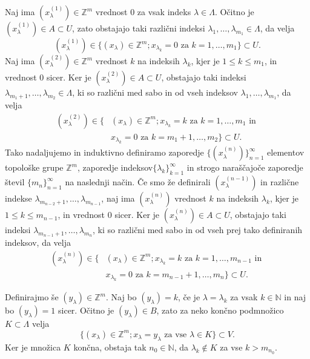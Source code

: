 \documentclass[mat1]{fmfdelo}
\newcommand{\N}{\mathbb N}
\newcommand{\Z}{\mathbb Z}
\begin{document}
\begin{dokaz}
Naj ima $(x_\lambda^{(1)}) \in \Z^m$ vrednost $0$ za vsak indeks $\lambda \in \Lambda$. Očitno je $(x_\lambda^{(1)}) \in A \subset U$, zato obstajajo taki različni indeksi $\lambda_1,\dots, \lambda_{m_1} \in \Lambda$, da velja
\[ (x_\lambda^{(1)}) \in \lbrace (x_\lambda) \in \Z^m ; x_{\lambda_k} = 0 \text{ za } k=1,\dots,m_1\rbrace \subset U. \]
Naj ima $(x_\lambda^{(2)}) \in \Z^m$ vrednost $k$ na indeksih $\lambda_k$, kjer je $1 \leq k \leq m_1$, in vrednost $0$ sicer. Ker je $(x_\lambda^{(2)}) \in A \subset U$, obstajajo taki indeksi $\lambda_{m_1+1},\dots,\lambda_{m_2} \in \Lambda$, ki so različni med sabo in od vseh indeksov $\lambda_1,\dots, \lambda_{m_1}$, da velja
\begin{align*}
(x_\lambda^{(2)}) \in \lbrace &(x_\lambda) \in \Z^m ; x_{\lambda_k} = k \text{ za } k=1,\dots,m_1 \text{ in }\\
& x_{\lambda_k} = 0 \text{ za } k = m_1+1,\dots, m_2\rbrace \subset U.
\end{align*}
Tako nadaljujemo in induktivno definiramo zaporedje $\lbrace (x_\lambda^{(n)}) \rbrace_{n = 1}^\infty$ elementov topološke grupe $\Z^m$, zaporedje indeksov$\lbrace\lambda_k\rbrace_{k = 1}^\infty$ in strogo naraščajoče zaporedje števil $\lbrace m_n \rbrace_{n = 1}^\infty$ na naslednji način. Če smo že definirali $(x_\lambda^{(n-1)})$ in različne indekse $\lambda_{m_{n-2}+1},\dots, \lambda_{m_{n-1}}$, naj ima $(x_\lambda^{(n)})$ vrednost $k$ na indeksih $\lambda_k$, kjer je $1 \leq k \leq m_{n-1}$, in vrednost $0$ sicer. Ker je $(x_\lambda^{(n)}) \in A \subset U$, obstajajo taki indeksi $\lambda_{m_{n-1}+1},\dots,\lambda_{m_n}$, ki so različni med sabo in od vseh prej tako definiranih indeksov, da velja
\begin{align*}
(x_\lambda^{(n)}) \in \lbrace &(x_\lambda) \in \Z^m ; x_{\lambda_k} = k \text{ za } k=1,\dots,m_{n-1} \text{ in }\\
& x_{\lambda_k} = 0 \text{ za } k = m_{n-1}+1,\dots, m_n\rbrace \subset U.
\end{align*}

Definirajmo še $(y_\lambda) \in \Z^m$. Naj bo $(y_\lambda) = k$, če je $\lambda = \lambda_k$ za vsak $k \in \N$ in naj bo $(y_\lambda) = 1$ sicer. Očitno je $(y_\lambda) \in B$, zato za neko končno podmnožico $K \subset \Lambda$ velja
\[ \lbrace (x_\lambda) \in \Z^m ; x_\lambda = y_\lambda \text{ za vse } \lambda \in K \rbrace \subset V. \]
Ker je množica $K$ končna, obstaja tak $n_0 \in \N$, da $\lambda_k \notin K$ za vse $k > m_{n_0}$.


\end{dokaz}
\end{document}
